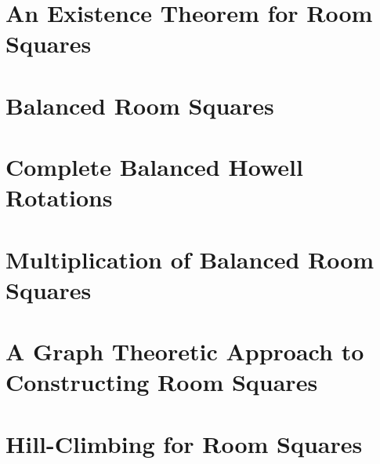 \documentclass[a4paper, draft]{book}
\begin{document}
\chapter{An Existence Theorem for Room Squares}
  \label{ch:existence-theorem}
  
  

\chapter{Balanced Room Squares}
  \label{ch:balanced-room-squares}
  

\chapter{Complete Balanced Howell Rotations}
  \label{ch:cbhr}
  
  

\chapter{Multiplication of Balanced Room Squares}
  \label{ch:brs-multiplication}
  

\chapter{A Graph Theoretic Approach to Constructing Room Squares}
  \label{ch:graph-theoretic}
  

\chapter{Hill-Climbing for Room Squares}
  \label{ch:hill-climbing}
  

\backmatter
\printbibliography[title=References]
\end{document}
